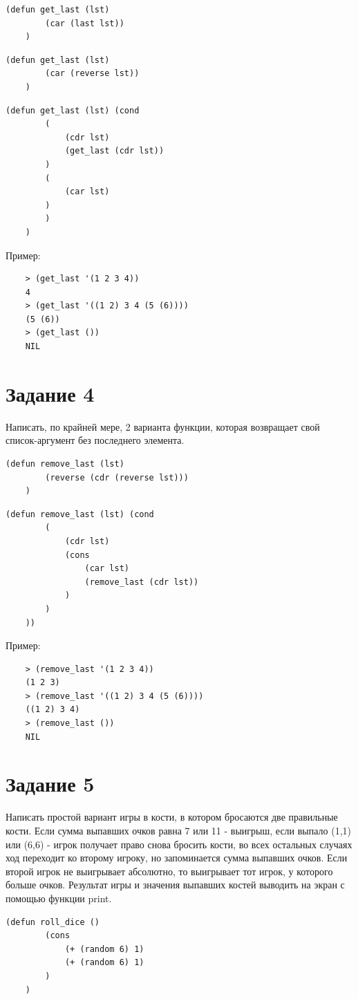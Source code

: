 \documentclass[a4paper, 12pt]{article}
\begin{document}
\begin{lstlisting}[caption=1-й вариант функции получения последнего элемента списка]
	(defun get_last (lst) 
		(car (last lst))
	)
\end{lstlisting}

\begin{lstlisting}[caption=2-й вариант функции получения последнего элемента списка]
	(defun get_last (lst) 
		(car (reverse lst))
	)
\end{lstlisting}
\clearpage
\newpage
\begin{lstlisting}[caption=3-й вариант функции получения последнего элемента списка]
	(defun get_last (lst) (cond 
		(
			(cdr lst)
			(get_last (cdr lst))
		)
		(
			(car lst)
		)
		)
	)
\end{lstlisting}

Пример:
\begin{lstlisting}
	> (get_last '(1 2 3 4))
	4
	> (get_last '((1 2) 3 4 (5 (6))))
	(5 (6))
	> (get_last ())
	NIL
\end{lstlisting}
\section*{Задание 4}
Написать, по крайней мере, 2 варианта функции, которая возвращает свой список-аргумент без последнего элемента.

\begin{lstlisting}[caption=1-й вариант функции получения спиcка без последнего элемента]
	(defun remove_last (lst) 
		(reverse (cdr (reverse lst)))
	)
\end{lstlisting}

\begin{lstlisting}[caption=2-й вариант функции получения спиcка без последнего элемента]
	(defun remove_last (lst) (cond 
		(
			(cdr lst) 
			(cons 
				(car lst) 
				(remove_last (cdr lst))
			)
		)
	))
\end{lstlisting}

Пример:
\begin{lstlisting}
	> (remove_last '(1 2 3 4))
	(1 2 3)
	> (remove_last '((1 2) 3 4 (5 (6))))
	((1 2) 3 4)
	> (remove_last ())
	NIL
\end{lstlisting}

\section*{Задание 5}
Написать простой вариант игры в кости, в котором бросаются две правильные кости. Если сумма выпавших очков равна 7 или 11 - выигрыш, если выпало (1,1) или (6,6) - игрок получает право снова бросить кости, во всех остальных случаях ход переходит ко второму игроку, но запоминается сумма выпавших очков. Если второй игрок не выигрывает абсолютно, то выигрывает тот игрок, у которого больше очков. Результат игры и значения выпавших костей выводить на экран с помощью функции print.
\begin{lstlisting}[caption=Функция подбрасывания костей]
	(defun roll_dice () 
		(cons 
			(+ (random 6) 1) 
			(+ (random 6) 1)
		)
	)
\end{lstlisting}
\end{document}
